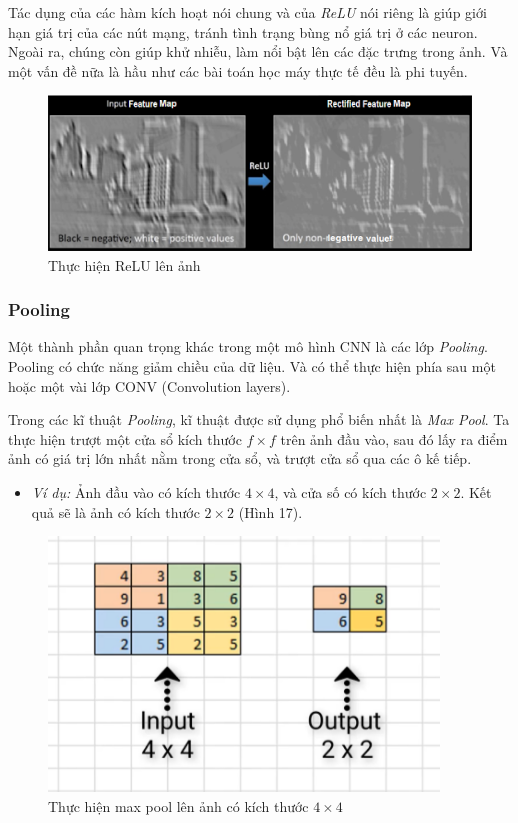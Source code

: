\documentclass[a4paper, 12pt]{article}
\begin{document}
Tác dụng của các hàm kích hoạt nói chung và của \textit{ReLU} nói riêng là giúp giới hạn giá trị của các nút mạng, tránh tình trạng bùng nổ giá trị ở các neuron. Ngoài ra, chúng còn giúp khử nhiễu, làm nổi bật lên các đặc trưng trong ảnh. Và một vấn đề  nữa là hầu như các bài toán học máy thực tế  đều là phi tuyến.

\begin{figure}[H]
    \begin{center} 
        \includegraphics[scale=0.8]{img/ReLU-img}
        \caption{Thực hiện ReLU lên ảnh}
    \end{center}
\end{figure}

\subsubsection{Pooling}
Một thành phần quan trọng khác trong một mô hình CNN là các lớp \textit{Pooling}. Pooling có chức năng giảm chiều của dữ liệu. Và có thể  thực hiện phía sau một hoặc một vài lớp CONV (Convolution layers).

Trong các kĩ thuật \textit{Pooling}, kĩ thuật được sử dụng phổ biến nhất là \textit{Max Pool}. Ta thực hiện trượt một cửa sổ  kích thước $f \times f$ trên ảnh đầu vào, sau đó lấy ra điểm ảnh có giá trị lớn nhất nằm trong cửa sổ, và trượt cửa sổ qua các ô kế tiếp. 
\begin{itemize}
    \item \textit{Ví dụ:} Ảnh đầu vào có kích thước $ 4 \times 4$, và cửa số có kích thước $2 \times 2$. Kết quả sẽ là ảnh có kích thước $2 \times 2$ (Hình 17).
\end{itemize}

\begin{figure}[H]
    \begin{center}
        \includegraphics[scale=0.8]{img/max-pool}
        \caption{Thực hiện max pool lên ảnh có kích thước $4 \times 4$}
    \end{center}
\end{figure}
\end{document}
